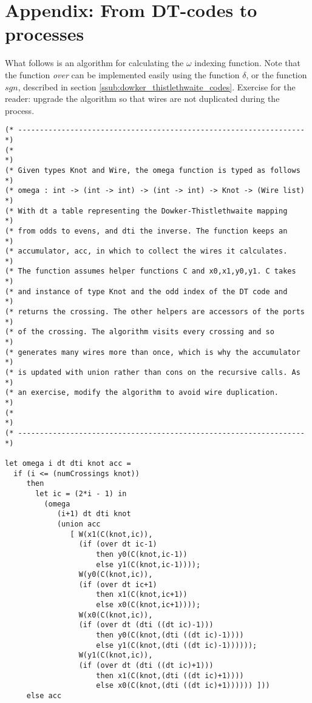 \section{Appendix: From DT-codes to processes}

What follows is an algorithm for calculating the $\omega$ indexing
function. Note that the function \emph{over} can be implemented easily using the function $\delta$, or the function $sgn$, described in section \ref{ssub:dowker_thistlethwaite_codes}. Exercise for the reader: upgrade the algorithm so that wires
are not duplicated during the process.  \newpage

\begin{verbatim}
(* ------------------------------------------------------------------ *)
(*                                                                    *)
(* Given types Knot and Wire, the omega function is typed as follows  *)
(* omega : int -> (int -> int) -> (int -> int) -> Knot -> (Wire list) *)
(* With dt a table representing the Dowker-Thistlethwaite mapping     *)
(* from odds to evens, and dti the inverse. The function keeps an     *)
(* accumulator, acc, in which to collect the wires it calculates.     *)
(* The function assumes helper functions C and x0,x1,y0,y1. C takes   *)
(* and instance of type Knot and the odd index of the DT code and     *)
(* returns the crossing. The other helpers are accessors of the ports *)
(* of the crossing. The algorithm visits every crossing and so        *)
(* generates many wires more than once, which is why the accumulator  *)
(* is updated with union rather than cons on the recursive calls. As  *)
(* an exercise, modify the algorithm to avoid wire duplication.       *)
(*                                                                    *)
(* ------------------------------------------------------------------ *)

let omega i dt dti knot acc = 
  if (i <= (numCrossings knot)) 
     then 
       let ic = (2*i - 1) in 
         (omega 
            (i+1) dt dti knot 
            (union acc 
               [ W(x1(C(knot,ic)), 
                 (if (over dt ic-1)
                     then y0(C(knot,ic-1))
                     else y1(C(knot,ic-1)))); 
                 W(y0(C(knot,ic)), 
                 (if (over dt ic+1)
                     then x1(C(knot,ic+1))
                     else x0(C(knot,ic+1)))); 
                 W(x0(C(knot,ic)), 
                 (if (over dt (dti ((dt ic)-1)))
                     then y0(C(knot,(dti ((dt ic)-1))))
                     else y1(C(knot,(dti ((dt ic)-1)))))); 
                 W(y1(C(knot,ic)), 
                 (if (over dt (dti ((dt ic)+1)))
                     then x1(C(knot,(dti ((dt ic)+1))))
                     else x0(C(knot,(dti ((dt ic)+1)))))) ])) 
     else acc
\end{verbatim}

